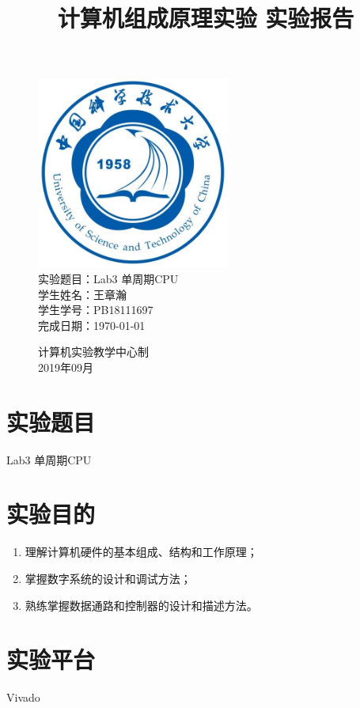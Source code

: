 \documentclass[UTF8]{article}
\title{计算机组成原理实验 实验报告}
\date{}
\begin{document}
\maketitle
\begin{figure}[H]
	\centering
	\includegraphics[width=2.5in]{xiaohui.png}\vspace{0.5cm}\\
	\large{
		实验题目：Lab3 单周期CPU\\
		学生姓名：王章瀚\\
		学生学号：PB18111697\\
		完成日期：\today\\
	}\vspace{2cm}
	
	\large{计算机实验教学中心制\\2019年09月\\}
	\thispagestyle{empty}
	\clearpage  %
\end{figure}
\newpage

\section{实验题目}
Lab3 单周期CPU

\section{实验目的}
\begin{enumerate}
	\item 理解计算机硬件的基本组成、结构和工作原理；
	\item 掌握数字系统的设计和调试方法；
	\item 熟练掌握数据通路和控制器的设计和描述方法。
\end{enumerate}

\section{实验平台}
Vivado
\end{document}
